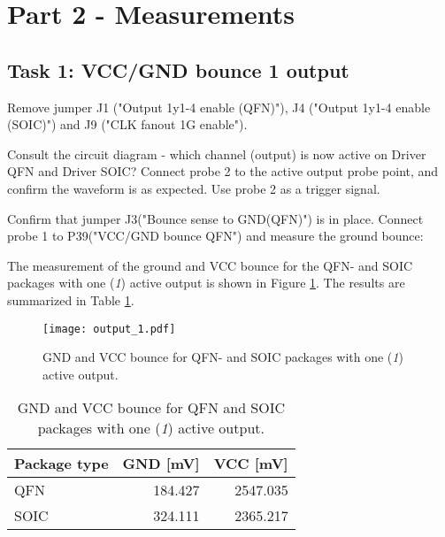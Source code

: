 \documentclass[../main.tex]{subfiles}
\begin{document}
\section{Part 2 - Measurements}

\subsection{Task 1: VCC/GND bounce 1 output}

Remove jumper J1 ("Output 1y1-4 enable (QFN)"), J4 ("Output 1y1-4 enable (SOIC)") and J9 ("CLK fanout 1G enable").

\vspace{10pt}

Consult the circuit diagram - which channel (output) is now active on Driver QFN and Driver SOIC? Connect probe 2 to the active output probe point, and confirm the waveform is as expected. Use probe 2 as a trigger signal.

\vspace{10pt}

Confirm that jumper J3("Bounce sense to GND(QFN)") is in place. Connect probe 1 to P39("VCC/GND bounce QFN") and measure the ground bounce:

\solution

The measurement of the ground and VCC bounce for the QFN- and SOIC packages with one (\textit{1}) active output is shown in Figure \ref{fig:gnd_vcc_output_1}. The results are summarized in Table \ref{tab:output_1}.

\begin{figure}[h]
    \centering
    \texttt{[image: output\_1.pdf]}
    \caption{GND and VCC bounce for QFN- and SOIC packages with one (\textit{1}) active output.}
    \label{fig:gnd_vcc_output_1}
\end{figure}

\begin{table}[h]
    \centering
    \begin{tabular}{l | r r}
        \toprule[1pt]
        Package type    & GND [mV]  & VCC [mV]\\
        \midrule
        QFN             & 184.427   & 2547.035  \\
        SOIC            & 324.111   & 2365.217  \\
        \bottomrule[1pt]
    \end{tabular}
    \caption{GND and VCC bounce for QFN and SOIC packages with one (\textit{1}) active output.}
    \label{tab:output_1}
\end{table}
\end{document}
